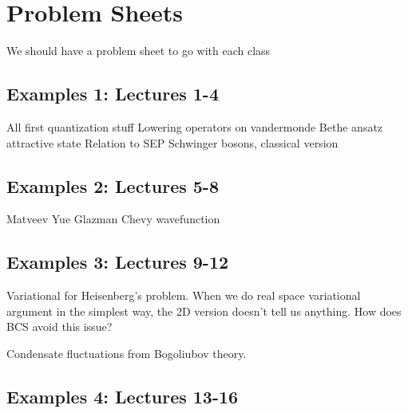 \section{Problem Sheets}


We should have a problem sheet to go with each class

\subsection{Examples 1: Lectures 1-4}

All first quantization stuff
Lowering operators on vandermonde
Bethe ansatz attractive state
Relation to SEP
Schwinger bosons, classical version

\subsection{Examples 2: Lectures 5-8}

Matveev Yue Glazman
Chevy wavefunction

\subsection{Examples 3: Lectures 9-12}

Variational for Heisenberg's problem. When we do real space variational argument in the simplest way, the 2D version doesn't tell us anything. How does BCS avoid this issue?

Condensate fluctuations from Bogoliubov theory.

\subsection{Examples 4: Lectures 13-16}



